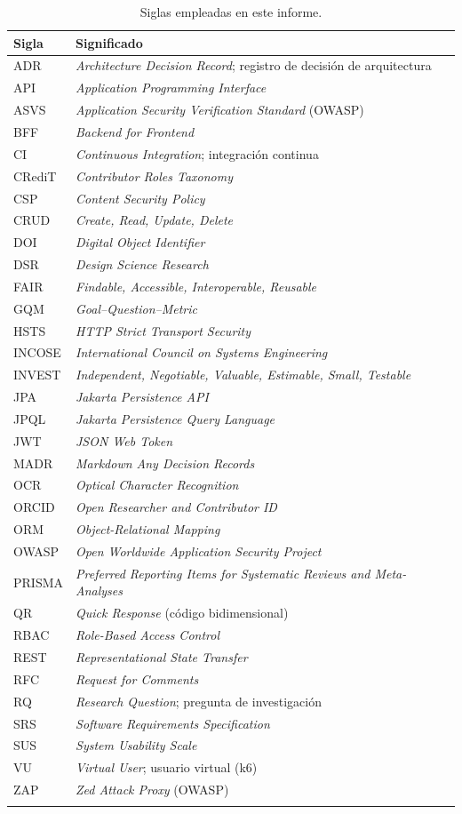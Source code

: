 \documentclass[11pt,a4paper]{article}
\begin{document}
\begin{longtable}{@{}p{2.6cm}p{12.4cm}@{}}
\toprule
\textbf{Sigla} & \textbf{Significado} \\
\midrule
\endhead
ADR & \emph{Architecture Decision Record}; registro de decisión de arquitectura \\
API & \emph{Application Programming Interface} \\
ASVS & \emph{Application Security Verification Standard} (OWASP) \\
BFF & \emph{Backend for Frontend} \\
CI & \emph{Continuous Integration}; integración continua \\
CRediT & \emph{Contributor Roles Taxonomy} \\
CSP & \emph{Content Security Policy} \\
CRUD & \emph{Create, Read, Update, Delete} \\
DOI & \emph{Digital Object Identifier} \\
DSR & \emph{Design Science Research} \\
FAIR & \emph{Findable, Accessible, Interoperable, Reusable} \\
GQM & \emph{Goal--Question--Metric} \\
HSTS & \emph{HTTP Strict Transport Security} \\
INCOSE & \emph{International Council on Systems Engineering} \\
INVEST & \emph{Independent, Negotiable, Valuable, Estimable, Small, Testable} \\
JPA & \emph{Jakarta Persistence API} \\
JPQL & \emph{Jakarta Persistence Query Language} \\
JWT & \emph{JSON Web Token} \\
MADR & \emph{Markdown Any Decision Records} \\
OCR & \emph{Optical Character Recognition} \\
ORCID & \emph{Open Researcher and Contributor ID} \\
ORM & \emph{Object-Relational Mapping} \\
OWASP & \emph{Open Worldwide Application Security Project} \\
PRISMA & \emph{Preferred Reporting Items for Systematic Reviews and Meta-Analyses} \\
QR & \emph{Quick Response} (código bidimensional) \\
RBAC & \emph{Role-Based Access Control} \\
REST & \emph{Representational State Transfer} \\
RFC & \emph{Request for Comments} \\
RQ & \emph{Research Question}; pregunta de investigación \\
SRS & \emph{Software Requirements Specification} \\
SUS & \emph{System Usability Scale} \\
VU & \emph{Virtual User}; usuario virtual (k6) \\
ZAP & \emph{Zed Attack Proxy} (OWASP) \\
\bottomrule
\caption{Siglas empleadas en este informe.}
\label{tab:siglas}
\end{longtable}
\end{document}
